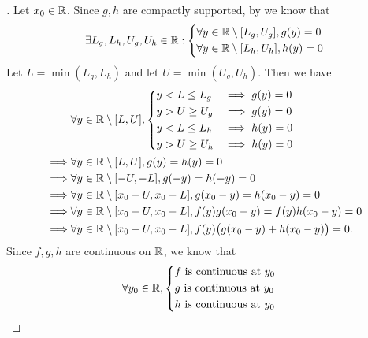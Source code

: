 \begin{proof}[]
  Let \(x_0 \in \mathbb{R}\).
  Since \(g, h\) are compactly supported, by  we know that
  \[
    \exists L_g, L_h, U_g, U_h \in \mathbb{R} : \begin{dcases}
      \forall y \in \mathbb{R} \setminus [L_g, U_g], g(y) = 0 \\
      \forall y \in \mathbb{R} \setminus [L_h, U_h], h(y) = 0
    \end{dcases}
  \]
  Let \(L = \min(L_g, L_h)\) and let \(U = \min(U_g, U_h)\).
  Then we have
  \begin{align*}
             & \forall y \in \mathbb{R} \setminus [L, U], \begin{dcases}
                                                    y < L \leq L_g & \implies g(y) = 0 \\
                                                    y > U \geq U_g & \implies g(y) = 0 \\
                                                    y < L \leq L_h & \implies h(y) = 0 \\
                                                    y > U \geq U_h & \implies h(y) = 0
                                                  \end{dcases}                      \\
    \implies & \forall y \in \mathbb{R} \setminus [L, U], g(y) = h(y) = 0                                         \\
    \implies & \forall y \in \mathbb{R} \setminus [-U, -L], g(-y) = h(-y) = 0                                     \\
    \implies & \forall y \in \mathbb{R} \setminus [x_0 - U, x_0 - L], g(x_0 - y) = h(x_0 - y) = 0                 \\
    \implies & \forall y \in \mathbb{R} \setminus [x_0 - U, x_0 - L], f(y) g(x_0 - y) = f(y) h(x_0 - y) = 0       \\
    \implies & \forall y \in \mathbb{R} \setminus [x_0 - U, x_0 - L], f(y) \big(g(x_0 - y) + h(x_0 - y)\big) = 0.
  \end{align*}
  Since \(f, g, h\) are continuous on \(\mathbb{R}\), we know that
  \begin{align*}
             & \forall y_0 \in \R, \begin{dcases}
                                     f \text{ is continuous at } y_0 \\
                                     g \text{ is continuous at } y_0 \\
                                     h \text{ is continuous at } y_0 \\

\end{dcases}
\end{align*}
\end{proof}
